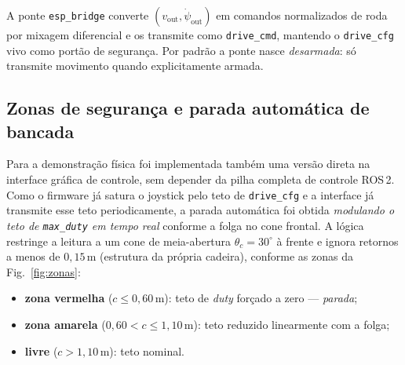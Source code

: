 \documentclass[conference]{IEEEtran}
\begin{document}
A ponte \texttt{esp\_bridge} converte $(v_{\text{out}},\dot\psi_{\text{out}})$ em
comandos normalizados de roda por mixagem diferencial e os transmite como
\texttt{drive\_cmd}, mantendo o \texttt{drive\_cfg} vivo como portão de
segurança. Por padrão a ponte nasce \emph{desarmada}: só transmite movimento
quando explicitamente armada.

\subsection{Zonas de segurança e parada automática de bancada}

Para a demonstração física foi implementada também uma versão direta na
interface gráfica de controle, sem depender da pilha completa de controle
ROS\,2. Como o firmware já satura o joystick pelo teto de \texttt{drive\_cfg} e
a interface já transmite esse teto periodicamente, a parada automática foi
obtida \emph{modulando o teto de \texttt{max\_duty} em tempo real} conforme a
folga no cone frontal. A lógica restringe a leitura a um cone de meia-abertura
$\theta_c=30^\circ$ à frente e ignora retornos a menos de $0{,}15$\,m (estrutura
da própria cadeira), conforme as zonas da Fig.~\ref{fig:zonas}:

\begin{itemize}
\item \textbf{zona vermelha} ($c \le 0{,}60$\,m): teto de \emph{duty} forçado a
zero --- \emph{parada};
\item \textbf{zona amarela} ($0{,}60 < c \le 1{,}10$\,m): teto reduzido
linearmente com a folga;
\item \textbf{livre} ($c > 1{,}10$\,m): teto nominal.
\end{itemize}
\end{document}
